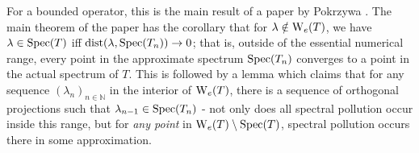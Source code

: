 \documentclass[../main.tex]{subfiles}
\begin{document}
For a bounded operator, this is the main result of a paper by Pokrzywa
\parencite{pokrzywa1979method}. The main theorem of the paper has the corollary
that for $\lambda \notin \mathrm{W}_e(T)$, we have $\lambda \in \mathrm{Spec}(T)$ iff
$\text{dist}(\lambda, \mathrm{Spec}(T_n)) \rightarrow 0$; that is, outside of the
essential numerical range, every point in the approximate spectrum $\mathrm{Spec}(T_n)$
converges to a point in the actual spectrum of $T$. This is followed by a lemma
which claims that for any sequence $(\lambda_n)_{n \in \mathbb{N}}$ in
the interior of $\mathrm{W}_e(T)$, there is a sequence of orthogonal projections such
that $\lambda_{n-1} \in \mathrm{Spec}(T_n)$ - not only does all spectral pollution occur
inside this range, but for \emph{any point} in $\mathrm{W}_e(T) \setminus \mathrm{Spec}(T)$,
spectral pollution occurs there in some approximation.
\end{document}
